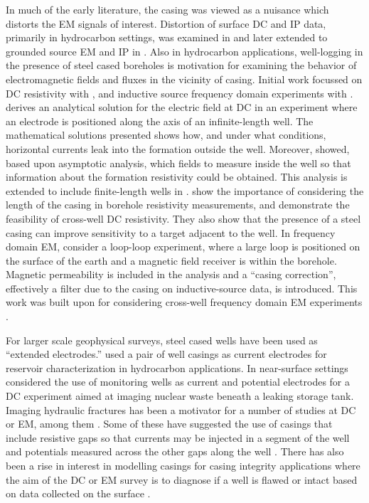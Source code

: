 In much of the early literature, the casing was viewed as a nuisance which distorts the EM signals of interest. Distortion of surface DC and IP data, primarily in hydrocarbon settings, was examined in \citep{Wait1983, Holladay1984, Johnston1987} and later extended to grounded source EM and IP in \citep{Wait1985, Williams1985, Johnston1992}. Also in hydrocarbon applications, well-logging in the presence of steel cased boreholes is motivation for examining the behavior of electromagnetic fields and fluxes in the vicinity of casing. Initial work focussed on DC resistivity with \citep{Kaufman1990, Schenkel1990, Kaufman1993, Schenkel1994}, and inductive source frequency domain experiments with \citep{Augustin1989}. \citep{Kaufman1990} derives an analytical solution for the electric field at DC in an experiment where an electrode is positioned along the axis of an infinite-length well. The mathematical solutions presented shows how, and under what conditions, horizontal currents leak into the formation outside the well. Moreover, \cite{Kaufman1990} showed, based upon asymptotic analysis, which fields to measure inside the well so that information about the formation resistivity could be obtained. This analysis is extended to include finite-length wells in \cite{Kaufman1993}. \cite{Schenkel1994} show the importance of considering the length of the casing in borehole resistivity measurements, and demonstrate the feasibility of cross-well DC resistivity. They also show that the presence of a steel casing can improve sensitivity to a target adjacent to the well. In frequency domain EM, \citep{Augustin1989} consider a loop-loop experiment, where a large loop is positioned on the surface of the earth and a magnetic field receiver is within the borehole. Magnetic permeability is included in the analysis and a ``casing correction'', effectively a filter due to the casing on inductive-source data, is introduced. This work was built upon for considering cross-well frequency domain EM experiments \citep{Uchida1991, Wilt1996}.

For larger scale geophysical surveys, steel cased wells have been used as ``extended electrodes.'' \cite{Rocroi1985} used a pair of well casings as current electrodes for reservoir characterization in hydrocarbon applications. In near-surface settings \citep{Ramirez1996, Rucker2010, Rucker2012} considered the use of monitoring wells as current and potential electrodes for a DC experiment aimed at imaging nuclear waste beneath a leaking storage tank. Imaging hydraulic fractures has been a motivator for a number of studies at DC or EM, among them \citep{Weiss2016, hoversten2017borehole}. Some of these have suggested the use of casings that include resistive gaps so that currents may be injected in a segment of the well and potentials measured across the other gaps along the well \citep{Nekut1995, Zhang2018}. There has also been a rise in interest in modelling casings for casing integrity applications where the aim of the DC or EM survey is to diagnose if a well is flawed or intact based on data collected on the surface \citep{Wilt2018}.

